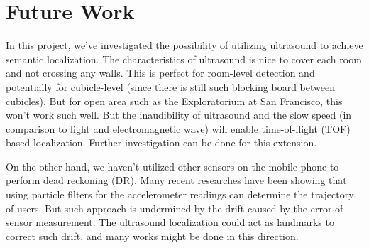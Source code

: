 
\section{Future Work}
\label{sec:future-work}

In this project, we've investigated the possibility of utilizing ultrasound to achieve semantic localization. The characteristics of ultrasound is nice to cover each room and not crossing any walls. This is perfect for room-level detection and potentially for cubicle-level (since there is still such blocking board between cubicles). But for open area such as the Exploratorium at San Francisco, this won't work such well. But the inaudibility of ultrasound and the slow speed (in comparison to light and electromagnetic wave) will enable time-of-flight (TOF) based localization. Further investigation can be done for this extension.

On the other hand, we haven't utilized other sensors on the mobile phone to perform dead reckoning (DR). Many recent researches have been showing that using particle filters for the accelerometer readings can determine the trajectory of users. But such approach is undermined by the drift caused by the error of sensor measurement. The ultrasound localization could act as landmarks to correct such drift, and many works might be done in this direction.
